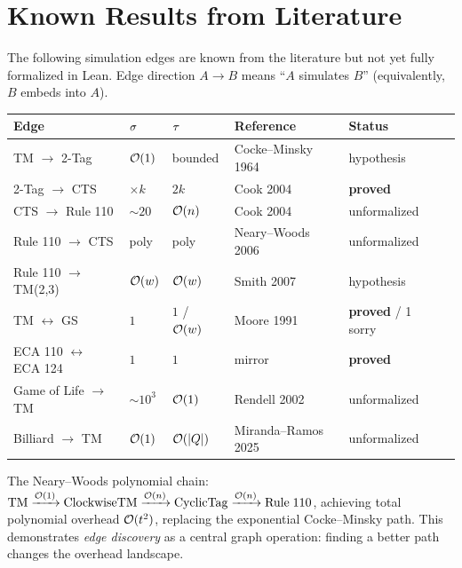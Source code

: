 \chapter{Known Results from Literature}\label{ch:literature}

The following simulation edges are known from the literature but not yet
fully formalized in Lean. Edge direction $A \to B$ means ``$A$ simulates $B$''
(equivalently, $B$ embeds into $A$).

\begin{center}
\begin{tabular}{llllll}
\toprule
Edge & $\sigma$ & $\tau$ & Reference & Status \\
\midrule
TM $\to$ 2-Tag & $\mathcal{O}(1)$ & bounded & Cocke--Minsky 1964 & hypothesis \\
2-Tag $\to$ CTS & $\times k$ & $2k$ & Cook 2004 & \textbf{proved} \\
CTS $\to$ Rule 110 & $\sim 20$ & $\mathcal{O}(n)$ & Cook 2004 & unformalized \\
Rule 110 $\to$ CTS & poly & poly & Neary--Woods 2006 & unformalized \\
Rule 110 $\to$ TM(2,3) & $\mathcal{O}(w)$ & $\mathcal{O}(w)$ & Smith 2007 & hypothesis \\
TM $\leftrightarrow$ GS & $1$ & $1$ / $\mathcal{O}(w)$ & Moore 1991 & \textbf{proved} / 1 sorry \\
ECA 110 $\leftrightarrow$ ECA 124 & $1$ & $1$ & mirror & \textbf{proved} \\
Game of Life $\to$ TM & $\sim 10^3$ & $\mathcal{O}(1)$ & Rendell 2002 & unformalized \\
Billiard $\to$ TM & $\mathcal{O}(1)$ & $\mathcal{O}(|Q|)$ & Miranda--Ramos 2025 & unformalized \\
\bottomrule
\end{tabular}
\end{center}

The Neary--Woods polynomial chain:
$\mathrm{TM} \xrightarrow{\mathcal{O}(1)} \mathrm{ClockwiseTM} \xrightarrow{\mathcal{O}(n)}
\mathrm{CyclicTag} \xrightarrow{\mathcal{O}(n)} \mathrm{Rule\;110}$,
achieving total polynomial overhead $\mathcal{O}(t^2)$, replacing the exponential
Cocke--Minsky path. This demonstrates \emph{edge discovery} as a central
graph operation: finding a better path changes the overhead landscape.
